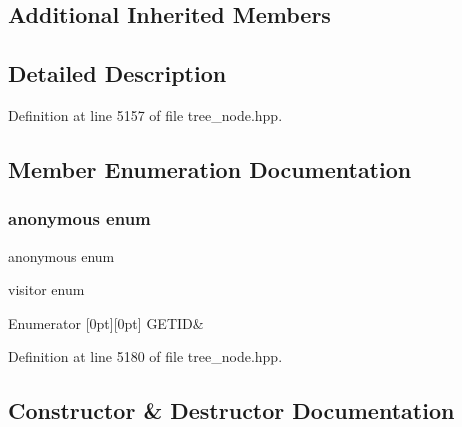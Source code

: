 \subsection*{Additional Inherited Members}


\subsection{Detailed Description}


Definition at line 5157 of file tree\+\_\+node.\+hpp.



\subsection{Member Enumeration Documentation}
\mbox{\label{structnontype__argument__pack_a5ef010ae300be1cdc75b14c02bbfb02a}} 
\subsubsection{\texorpdfstring{anonymous enum}{anonymous enum}}
{\footnotesize\ttfamily anonymous enum}



visitor enum 

\begin{DoxyEnumFields}{Enumerator}
[0pt][0pt]{}\mbox{\label{structnontype__argument__pack_a5ef010ae300be1cdc75b14c02bbfb02aac9b3fafc9571a18505283c8c44a4de28}} 
G\+E\+T\+ID&\\
\hline

\end{DoxyEnumFields}


Definition at line 5180 of file tree\+\_\+node.\+hpp.



\subsection{Constructor \& Destructor Documentation}
\mbox{\label{structnontype__argument__pack_a37f435a7d04e821fd0532edfea38e6c9}} 

